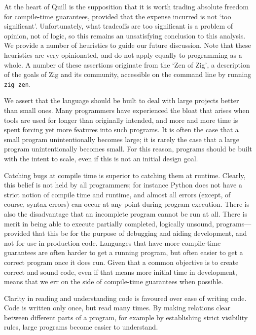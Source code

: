 \documentclass[UKenglish, 11pt, a4paper, parskip=half]{scrbook}
\newcommand{\inlinecode}[1]{\lstinline{#1}}
\begin{document}
At the heart of Quill is the supposition that it is worth trading absolute freedom for compile-time guarantees, provided that the expense incurred is not `too significant'.
Unfortunately, what tradeoffs are too significant is a problem of opinion, not of logic, so this remains an unsatisfying conclusion to this analysis.
We provide a number of heuristics to guide our future discussion.
Note that these heuristics are very opinionated, and do not apply equally to programming as a whole.
A number of these assertions originate from the `Zen of Zig', a description of the goals of Zig and its community, accessible on the command line by running \inlinecode{zig zen}.

We assert that the language should be built to deal with large projects better than small ones.
Many programmers have experienced the bloat that arises when tools are used for longer than originally intended, and more and more time is spent forcing yet more features into such programs.
It is often the case that a small program unintentionally becomes large; it is rarely the case that a large program unintentionally becomes small.
For this reason, programs should be built with the intent to scale, even if this is not an initial design goal.

Catching bugs at compile time is superior to catching them at runtime.
Clearly, this belief is not held by all programmers; for instance Python does not have a strict notion of compile time and runtime, and almost all errors (except, of course, syntax errors) can occur at any point during program execution.
There is also the disadvantage that an incomplete program cannot be run at all.
There is merit in being able to execute partially completed, logically unsound, programs---provided that this be for the purpose of debugging and aiding development, and not for use in production code.
Languages that have more compile-time guarantees are often harder to get a running program, but often easier to get a correct program once it does run.
Given that a common objective is to create correct and sound code, even if that means more initial time in development, means that we err on the side of compile-time guarantees when possible.

Clarity in reading and understanding code is favoured over ease of writing code.
Code is written only once, but read many times.
By making relations clear between different parts of a program, for example by establishing strict visibility rules, large programs become easier to understand.
\end{document}
